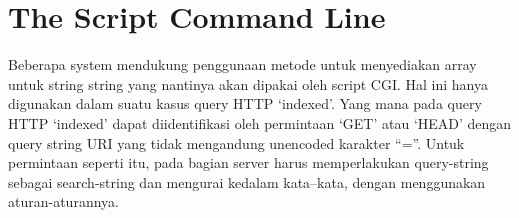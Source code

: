 \documentclass{article}
\begin{document}
\section{The Script Command Line}
Beberapa system mendukung penggunaan metode untuk menyediakan array untuk string string yang nantinya akan dipakai oleh script CGI. Hal ini hanya digunakan dalam suatu kasus query HTTP ‘indexed’. Yang mana pada query HTTP ‘indexed’ dapat diidentifikasi oleh permintaan ‘GET’  atau ‘HEAD’ dengan query string URI yang tidak mengandung unencoded karakter “=”. Untuk permintaan seperti itu, pada bagian server harus memperlakukan query-string sebagai search-string dan mengurai kedalam kata–kata, dengan menggunakan aturan-aturannya.
\end{document}

